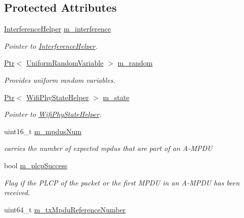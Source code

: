 \subsection*{Protected Attributes}
\begin{DoxyCompactItemize}
\item 
\hyperlink{classns3_1_1InterferenceHelper}{Interference\+Helper} \hyperlink{classns3_1_1WifiPhy_a55909109ad2e2759702336770fa90119}{m\+\_\+interference}
\begin{DoxyCompactList}\small\item\em Pointer to \hyperlink{classns3_1_1InterferenceHelper}{Interference\+Helper}. \end{DoxyCompactList}\item 
\hyperlink{classns3_1_1Ptr}{Ptr}$<$ \hyperlink{classns3_1_1UniformRandomVariable}{Uniform\+Random\+Variable} $>$ \hyperlink{classns3_1_1WifiPhy_a0fd27ae928c74ebda56129b5b4248b90}{m\+\_\+random}
\begin{DoxyCompactList}\small\item\em Provides uniform random variables. \end{DoxyCompactList}\item 
\hyperlink{classns3_1_1Ptr}{Ptr}$<$ \hyperlink{classns3_1_1WifiPhyStateHelper}{Wifi\+Phy\+State\+Helper} $>$ \hyperlink{classns3_1_1WifiPhy_a020dae8902d858e3d121aa7a67ca2528}{m\+\_\+state}
\begin{DoxyCompactList}\small\item\em Pointer to \hyperlink{classns3_1_1WifiPhyStateHelper}{Wifi\+Phy\+State\+Helper}. \end{DoxyCompactList}\item 
uint16\+\_\+t \hyperlink{classns3_1_1WifiPhy_aea15140c77315a8bf71eff068ea6570e}{m\+\_\+mpdus\+Num}
\begin{DoxyCompactList}\small\item\em carries the number of expected mpdus that are part of an A-\/\+M\+P\+DU \end{DoxyCompactList}\item 
bool \hyperlink{classns3_1_1WifiPhy_ad9a571bc52ef6cd8e63cff3dc14a718e}{m\+\_\+plcp\+Success}
\begin{DoxyCompactList}\small\item\em Flag if the P\+L\+CP of the packet or the first M\+P\+DU in an A-\/\+M\+P\+DU has been received. \end{DoxyCompactList}\item 
uint64\+\_\+t \hyperlink{classns3_1_1WifiPhy_a65b97f34265cf958696286ddbd0fcb17}{m\+\_\+tx\+Mpdu\+Reference\+Number}

\end{DoxyCompactItemize}
